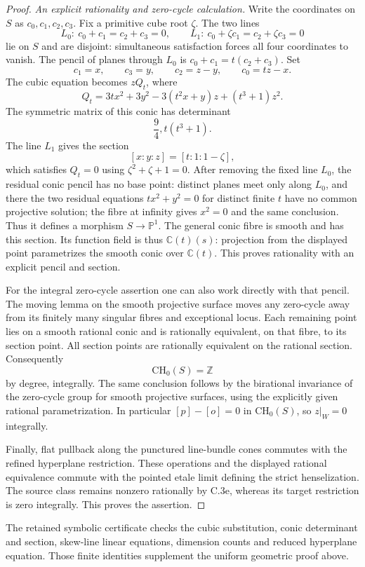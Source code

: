 \begin{proof}
\emph{An explicit rationality and zero-cycle calculation.}
Write the coordinates on $S$ as $c_0,c_1,c_2,c_3$.
Fix a primitive cube root $\zeta$. The two lines
\[
 L_0:\ c_0+c_1=c_2+c_3=0,
 \qquad
 L_1:\ c_0+\zeta c_1=c_2+\zeta c_3=0
\]
lie on $S$ and are disjoint: simultaneous satisfaction
forces all four coordinates to vanish. The pencil of
planes through $L_0$ is
$c_0+c_1=t(c_2+c_3)$. Set
\[
 c_1=x,\qquad c_3=y,\qquad
 c_2=z-y,\qquad c_0=tz-x.
\]
The cubic equation becomes $zQ_t$, where
\[
 Q_t=3tx^2+3y^2-3(t^2x+y)z+(t^3+1)z^2.
\]
The symmetric matrix of this conic has determinant
\[
                         \frac94,t(t^3+1).
\]
The line $L_1$ gives the section
\[
                         [x:y:z]=[t:1:1-\zeta],
\]
which satisfies $Q_t=0$ using $\zeta^2+\zeta+1=0$.
After removing the fixed line $L_0$, the residual
conic pencil has no base point: distinct planes meet
only along $L_0$, and there the two residual equations
$tx^2+y^2=0$ for distinct finite $t$ have no common
projective solution; the fibre at infinity gives
$x^2=0$ and the same conclusion. Thus it defines a
morphism $S\to\mathbb P^1$. The general conic fibre
is smooth and has this section. Its function field is thus
$\mathbb C(t)(s)$: projection from the displayed point
parametrizes the smooth conic over $\mathbb C(t)$.
This proves rationality with an explicit pencil and
section.

For the integral zero-cycle assertion one can also work
directly with that pencil. The moving lemma on the smooth
projective surface moves any zero-cycle away from its
finitely many singular fibres and exceptional locus.
Each remaining point lies on a smooth rational conic and
is rationally equivalent, on that fibre, to its section
point. All section points are rationally equivalent on
the rational section. Consequently
\[
                         \mathrm{CH}_0(S)=\mathbb Z
\]
by degree, integrally. The same conclusion follows by
the birational invariance of the zero-cycle group for
smooth projective surfaces, using the explicitly given
rational parametrization. In particular $[p]-[o]=0$
in $\mathrm{CH}_0(S)$, so $z|_W=0$ integrally.

Finally, flat pullback along the punctured line-bundle
cones commutes with the refined hyperplane restriction.
These operations and the displayed rational equivalence
commute with the pointed etale limit defining the strict
henselization. The source class remains nonzero rationally
by C.3e, whereas its target restriction is zero integrally.
This proves the assertion.
\end{proof}

The retained symbolic certificate checks the cubic
substitution, conic determinant and section, skew-line
linear equations, dimension counts and reduced hyperplane
equation. Those finite identities supplement the uniform
geometric proof above.

